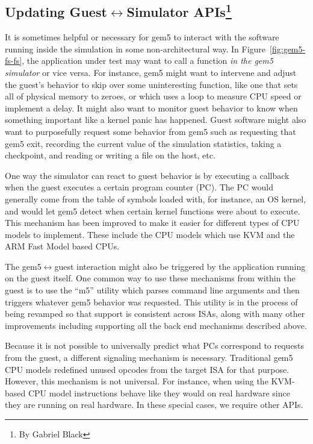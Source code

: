 \subsection[Updating Guest<->Simulator APIs]{Updating Guest$\leftrightarrow$Simulator APIs\footnote{By Gabriel Black}}
\label{sec:guest-sim}

It is sometimes helpful or necessary for gem5 to interact with the software running inside the simulation in some non-architectural way.
In Figure~\ref{fig:gem5-fs-fs}, the application under test may want to call a function \emph{in the gem5 simulator} or vice versa.
For instance, gem5 might want to intervene and adjust the guest's behavior to skip over some uninteresting function, like one that sets all of physical memory to zeroes, or which uses a loop to measure CPU speed or implement a delay.
It might also want to monitor guest behavior to know when something important like a kernel panic has happened.
Guest software might also want to purposefully request some behavior from gem5 such as requesting that gem5 exit, recording the current value of the simulation statistics, taking a checkpoint,  and reading or writing a file on the host, etc.

One way the simulator can react to guest behavior is by executing a callback when the guest executes a certain program counter (PC).
The PC would generally come from the table of symbols loaded with, for instance, an OS kernel, and would let gem5 detect when certain kernel functions were about to execute.
This mechanism has been improved to make it easier for different types of CPU models to implement.
These include the CPU models which use KVM and the ARM Fast Model based CPUs.

The gem5$\leftrightarrow$guest interaction might also be triggered by the application running on the guest itself.
One common way to use these mechanisms from within the guest is to use the ``m5'' utility which parses command line arguments and then triggers whatever gem5 behavior was requested.
This utility is in the process of being revamped so that support is consistent across ISAs, along with many other improvements including supporting all the back end mechanisms described above.

Because it is not possible to universally predict what PCs correspond to requests from the guest, a different signaling mechanism is necessary.
Traditional gem5 CPU models redefined unused opcodes from the target ISA for that purpose.
However, this mechanism is not universal.
For instance, when using the KVM-based CPU model instructions behave like they would on real hardware since they are running on real hardware.
In these special cases, we require other APIs.

